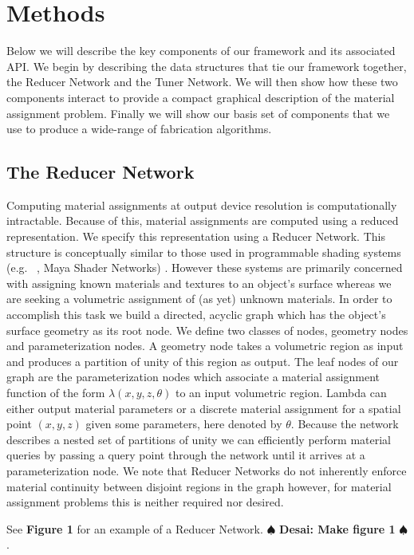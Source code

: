 \documentclass[annual]{acmsiggraph}
\newcommand{\note}[1]{\marginpar{\LARGE $\spadesuit$}
			$\spadesuit$ {\bf #1} $\spadesuit$}
\begin{document}
\section{Methods}
Below we will describe the key components of our framework and its associated API. We begin by describing the data structures that tie our framework together, the Reducer Network and the Tuner Network. We will then show how these two components interact to provide a compact graphical description of the material assignment problem. Finally we will show our basis set of components that we use to produce a wide-range of fabrication algorithms. 
\subsection{The Reducer Network}
Computing material assignments at output device resolution is computationally intractable. Because of this, material assignments are computed  using a reduced representation. We specify this representation using a Reducer Network.  This structure is conceptually similar to those used in programmable shading systems (e.g. ~\cite{Cook1984}, Maya Shader Networks) . However these systems are primarily concerned with assigning known materials and textures to an object's surface whereas we are seeking a volumetric assignment of (as yet) unknown materials. In order to accomplish this task we build a directed, acyclic graph which has the object's surface geometry as its root node. We define two classes of nodes, geometry nodes and parameterization nodes. A geometry node takes a volumetric region as input and produces a partition of unity of this region as output. The leaf nodes of our graph are the parameterization nodes which associate a material assignment function of the form $\lambda\left(x,y,z,\theta\right)$ to an input volumetric region. Lambda can either output material parameters or a discrete material assignment for a spatial point $\left(x,y,z\right)$ given some parameters, here denoted by $\theta$. Because the network describes a nested set of partitions of unity we can efficiently perform material queries by passing a query point through the network until it arrives at a parameterization node. We note that Reducer Networks do not inherently enforce material continuity between disjoint regions in the graph however, for material assignment problems this is neither required nor desired. 

 See \textbf{Figure 1} for an example of a Reducer Network. \note{Desai: Make figure 1}.  
\end{document}
